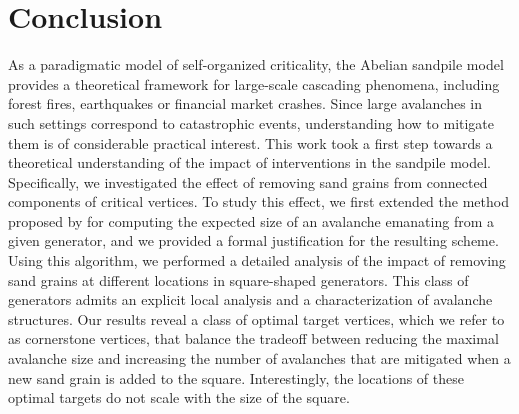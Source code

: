 \documentclass{article}
\begin{document}

\section{Conclusion}
\label{Conclusion}
As a paradigmatic model of self-organized criticality, the Abelian sandpile model provides a theoretical framework for large-scale cascading phenomena, including forest fires, earthquakes or financial market crashes. Since large avalanches in such settings correspond to catastrophic events, understanding how to mitigate them is of considerable practical interest. This work took a first step towards a theoretical understanding of the impact of interventions in the sandpile model. Specifically, we investigated the effect of removing sand grains from connected components of critical vertices. To study this effect, we first extended the method proposed by \citet{Dorso} for computing the expected size of an avalanche emanating from a given generator, and we provided a formal justification for the resulting scheme. Using this algorithm, we performed a detailed analysis of the impact of removing sand grains at different locations in square-shaped generators. This class of generators admits an explicit local analysis and a characterization of avalanche structures. Our results reveal a class of optimal target vertices, which we refer to as cornerstone vertices, that balance the tradeoff between reducing the maximal avalanche size and increasing the number of avalanches that are mitigated when a new sand grain is added to the square. Interestingly, the locations of these optimal targets do not scale with the size of the square. 
\end{document}
